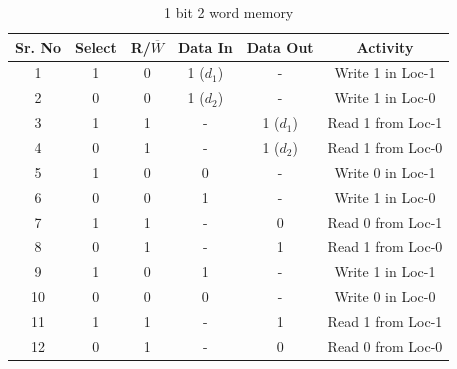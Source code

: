 \documentclass[a4paper]{article}
\begin{document}
\begin{table}[h!]
    \begin{center}
        \begin{tabular}{|c|c|c|c|c|c|}
            \hline
            \textbf{Sr. No} & \textbf{Select} & \textbf{R/$\overline{W}$} & \textbf{Data In} & \textbf{Data Out} & \textbf{Activity} \\
            \hline
            1               & 1               & 0                         & 1 ($d_1$)        & -                 & Write 1 in Loc-1  \\
            2               & 0               & 0                         & 1 ($d_2$)        & -                 & Write 1 in Loc-0  \\
            3               & 1               & 1                         & -                & 1  ($d_1$)        & Read 1 from Loc-1 \\
            4               & 0               & 1                         & -                & 1  ($d_2$)        & Read 1 from Loc-0 \\
            5               & 1               & 0                         & 0                & -                 & Write 0 in Loc-1  \\
            6               & 0               & 0                         & 1                & -                 & Write 1 in Loc-0  \\
            7               & 1               & 1                         & -                & 0                 & Read 0 from Loc-1 \\
            8               & 0               & 1                         & -                & 1                 & Read 1 from Loc-0 \\
            9               & 1               & 0                         & 1                & -                 & Write 1 in Loc-1  \\
            10              & 0               & 0                         & 0                & -                 & Write 0 in Loc-0  \\
            11              & 1               & 1                         & -                & 1                 & Read 1 from Loc-1 \\
            12              & 0               & 1                         & -                & 0                 & Read 0 from Loc-0 \\
            \hline
        \end{tabular}
        \label{tab:1b2w}
        \caption{1 bit 2 word memory}
    \end{center}
\end{table}
\end{document}
